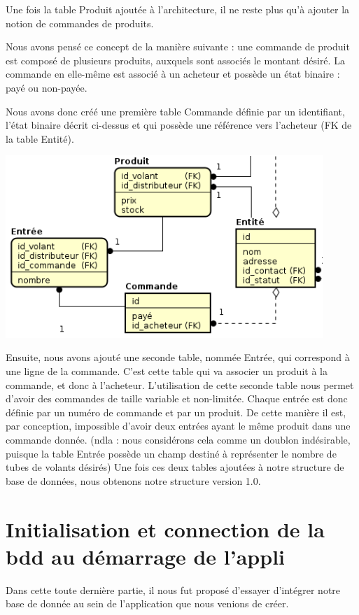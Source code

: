 \documentclass[french,a4paper,12pt]{report}
\begin{document}
Une fois la table Produit ajoutée à l'architecture, il ne reste plus qu'à
ajouter la notion de commandes de produits.

Nous avons pensé ce concept de la manière suivante : une commande de produit
est composé de plusieurs produits, auxquels sont associés le montant désiré.
La commande en elle-même est associé à un acheteur et possède un état binaire :
payé ou non-payée.

Nous avons donc créé une première table Commande définie par un identifiant,
l'état binaire décrit ci-dessus et qui possède une référence vers l'acheteur
(FK de la table Entité).

\includegraphics[width=12cm]{ensemble3.png}

Ensuite, nous avons ajouté une seconde table, nommée Entrée, qui correspond à
une ligne de la commande. C'est cette table qui va associer un produit à la
commande, et donc à l'acheteur. L'utilisation de cette seconde table nous permet
 d'avoir des commandes de taille variable et non-limitée.
Chaque entrée est donc définie par un numéro de commande et par un produit.
De cette manière il est, par conception, impossible d'avoir deux entrées ayant
 le même produit dans une commande donnée.
(ndla : nous considérons cela comme un doublon indésirable, puisque la table
Entrée possède un champ destiné à représenter le nombre de tubes de volants désirés)
Une fois ces deux tables ajoutées à notre structure de base de données, nous
obtenons notre structure version 1.0.

\section{Initialisation et connection de la bdd au démarrage de l'appli}
Dans cette toute dernière partie, il nous fut proposé d'essayer d'intégrer notre
base de donnée au sein de l'application que nous venions de créer.
\end{document}
